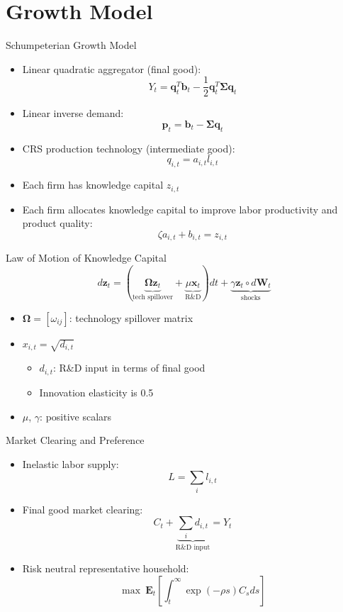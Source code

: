 \documentclass[
  10pt, %
  aspectratio=169,  %
  handout
]{beamer}
\theoremstyle{plain}
\begin{document}
\section{Growth Model}
\begin{frame}{Schumpeterian Growth Model}

  \begin{itemize}
    \item Linear quadratic aggregator (final good):
          \[
            Y_{t}=\boldsymbol{q}_{t}^{T}\boldsymbol{b}_{t}-\frac{1}{2}\boldsymbol{q}_{t}^{T}\boldsymbol{\Sigma}\boldsymbol{q}_{t}
          \]
    \item Linear inverse demand:
          \[
            \boldsymbol{p}_{t}=\boldsymbol{b}_{t}-\boldsymbol{\Sigma}\boldsymbol{q}_{t}
          \]
    \item CRS production technology (intermediate good): \[q_{i,t}=a_{i,t}l_{i,t}\]
    \item Each firm has knowledge capital $z_{i,t}$\medskip{}
    \item Each firm allocates knowledge capital to improve labor productivity
          and product quality:
          \[
            \zeta a_{i,t}+b_{i,t}=z_{i,t}
          \]
  \end{itemize}
\end{frame}
%
\begin{frame}{Law of Motion of Knowledge Capital}
  \[
    d\boldsymbol{z}_{t}=\left(\underbrace{\boldsymbol{\Omega}\boldsymbol{z}_{t}}_{\text{tech spillover}}+\underbrace{\mu\boldsymbol{x}_{t}}_{\text{R\&D}}\right)dt+\underbrace{\gamma\boldsymbol{z}_{t} \circ d\boldsymbol{W}_{t}}_{\text{shocks}}
  \]
  \begin{itemize}
    \item $\boldsymbol{\Omega}=\left[\omega_{ij}\right]$: technology spillover matrix\medskip{}
    \item $x_{i,t}=\sqrt{d_{i,t}}$
          \begin{itemize}
            \item $d_{i,t}$: R\&D input in terms of final good
            \item Innovation elasticity is 0.5\medskip{}
          \end{itemize}
    \item $\mu$, $\gamma$: positive scalars
  \end{itemize}
\end{frame}
%
\begin{frame}{Market Clearing and Preference}
  \begin{itemize}
    \item Inelastic labor supply:
          \[
            L=\sum_{i}l_{i,t}
          \]
    \item Final good market clearing:
          \[
            C_{t}+\underbrace{\sum_{i}d_{i,t}}_{\text{R\&D input}}=Y_{t}
          \]
    \item Risk neutral representative household:
          \[
            \max\ \boldsymbol{E}_{t}\left[\int_{t}^{\infty}\exp\left(-\rho s\right)C_{s}ds\right]
          \]
  \end{itemize}
\end{frame}
%
\end{document}
